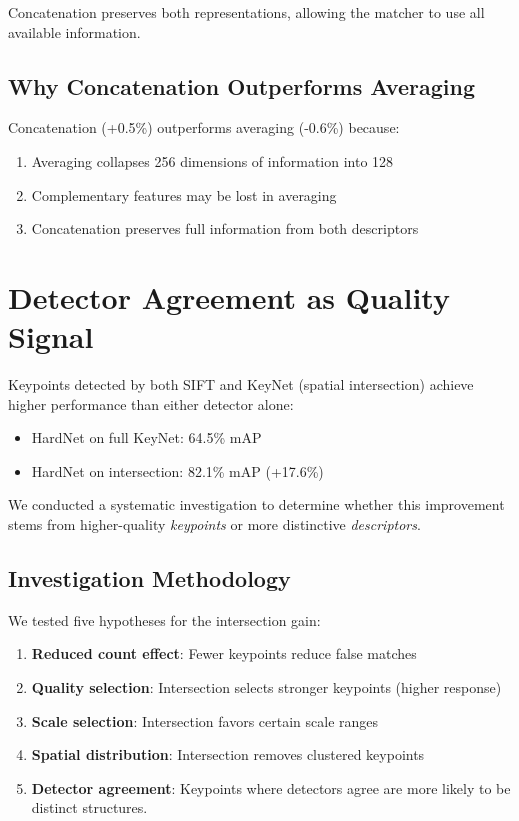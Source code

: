 Concatenation preserves both representations, allowing the matcher to use all available information.

\subsection{Why Concatenation Outperforms Averaging}

Concatenation (+0.5\%) outperforms averaging (-0.6\%) because:
\begin{enumerate}
    \item Averaging collapses 256 dimensions of information into 128
    \item Complementary features may be lost in averaging
    \item Concatenation preserves full information from both descriptors
\end{enumerate}

\section{Detector Agreement as Quality Signal}

Keypoints detected by both SIFT and KeyNet (spatial intersection) achieve higher performance than either detector alone:
\begin{itemize}
    \item HardNet on full KeyNet: 64.5\% mAP
    \item HardNet on intersection: 82.1\% mAP (+17.6\%)
\end{itemize}

We conducted a systematic investigation to determine whether this improvement stems from higher-quality \textit{keypoints} or more distinctive \textit{descriptors}.

\subsection{Investigation Methodology}

We tested five hypotheses for the intersection gain:
\begin{enumerate}
    \item \textbf{Reduced count effect}: Fewer keypoints reduce false matches
    \item \textbf{Quality selection}: Intersection selects stronger keypoints (higher response)
    \item \textbf{Scale selection}: Intersection favors certain scale ranges
    \item \textbf{Spatial distribution}: Intersection removes clustered keypoints
    \item \textbf{Detector agreement}: Keypoints where detectors agree are more likely to be distinct structures.
\end{enumerate}

